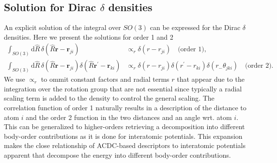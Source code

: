 \subsection{Solution for Dirac $\delta$ densities}

An explicit solution of the integral over $SO(3)$ can be expressed for the Dirac $\delta$ densities.
Here we present the solutions for order 1 and 2 
\begin{subequations}
\label{eq:dirac_delta_haar_integral}
\begin{align}
    \label{eq:dirac_delta_haar_integral_2body}
    \int_{SO(3)} \mathrm{d}\hat{R}\, \delta(\hat{R}\mathbf{r}-\mathbf{r}_{ji}) &\propto_r \delta(r-r_{ji})\quad\textrm{(order 1)},  \\%
    \label{eq:dirac_delta_haar_integral_3body}
    \int_{SO(3)} \mathrm{d}\hat{R}\, \delta(\hat{R}\mathbf{r}-\mathbf{r}_{ji}) \delta(\hat{R}\mathbf{r}^\prime-\mathbf{r}_{ki}) &\propto_r \delta(r-r_{ji})\delta(r^\prime-r_{ki})\delta(r_-\theta_{jki})\quad\textrm{(order 2)}. %
\end{align}
\end{subequations}
We use $\propto_r$ to ommit constant factors and radial terms $r$ that appear due to the integration over the rotation group that are not essential since typically a radial scaling term is added to the density to control the general scaling\cite{behler2011atom,LIBRASCAL,drautz2019atomic}.
The correlation function of order 1 naturally results in a description of the distance to atom $i$ and the order 2 function in the two distances and an angle wrt. atom $i$.
This can be generalized to higher-orders retrieving a decomposition into different body-order contributions as it is done for interatomic potentials.
This expansion makes the close relationship of ACDC-based descriptors to interatomic potentials apparent that decompose the energy into different body-order contributions.

